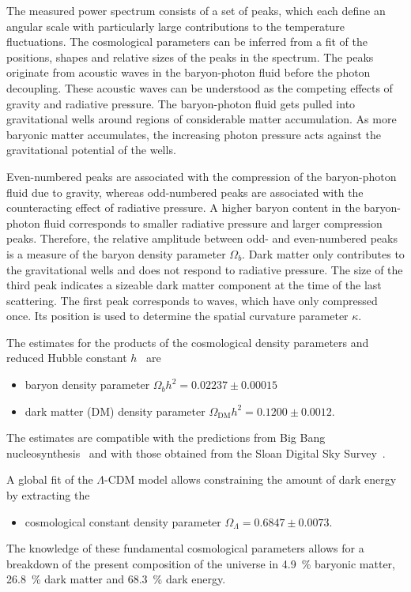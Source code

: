 The measured power spectrum consists of a set of peaks, which each define an angular scale with particularly large contributions to the temperature fluctuations. The cosmological parameters can be inferred from a fit of the positions, shapes and relative sizes of the peaks in the spectrum. The peaks originate from acoustic waves in the baryon-photon fluid before the photon decoupling. These acoustic waves can be understood as the competing effects of gravity and radiative pressure. The baryon-photon fluid gets pulled into gravitational wells around regions of considerable matter accumulation. As more baryonic matter accumulates, the increasing photon pressure acts against the gravitational potential of the wells.

Even-numbered peaks are associated with the compression of the baryon-photon fluid due to gravity, whereas odd-numbered peaks are associated with the counteracting effect of radiative pressure. A higher baryon content in the baryon-photon fluid corresponds to smaller radiative pressure and larger compression peaks. Therefore, the relative amplitude between odd- and even-numbered peaks is a measure of the baryon density parameter \(\Omega_{b}\). Dark matter only contributes to the gravitational wells and does not respond to radiative pressure. The size of the third peak indicates a sizeable dark matter component at the time of the last scattering. The first peak corresponds to waves, which have only compressed once. Its position is used to determine the spatial curvature parameter \(\kappa\).

The estimates for the products of the cosmological density parameters and reduced Hubble constant \(h\)~\cite{Planck2020} are
\begin{itemize}
    \item baryon density parameter \(\Omega_{b} h^2 = \num{0.02237} \pm \num{0.00015}\)
    \item dark matter (DM) density parameter \(\Omega_{\text{DM}} h^2 = \num{0.1200} \pm \num{0.0012}\).
\end{itemize}
The estimates are compatible with the predictions from Big Bang nucleosynthesis~\cite{Simha2008} and with those obtained from the Sloan Digital Sky Survey~\cite{Tegmark2004}.

A global fit of the \(\Lambda\)-CDM model allows constraining the amount of dark energy by extracting the
\begin{itemize}
    \item cosmological constant density parameter \(\Omega_{\Lambda} = \num{0.6847} \pm \num{0.0073}\).
\end{itemize}
The knowledge of these fundamental cosmological parameters allows for a breakdown of the present composition of the universe in \SI{4.9}{\percent} baryonic matter, \SI{26.8}{\percent} dark matter and \SI{68.3}{\percent} dark energy.

